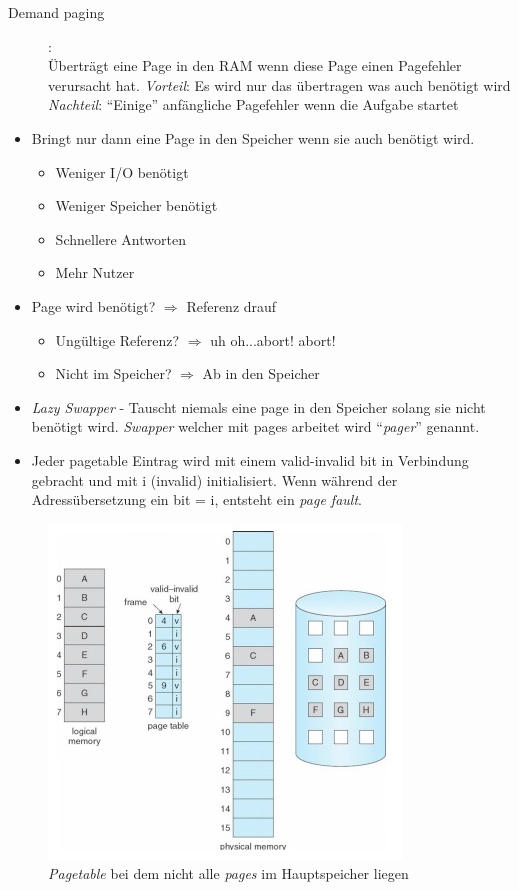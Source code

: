 \documentclass[a4paper]{scrreprt}
\begin{document}
\begin{description}
\item[Demand paging]:\ \\ Überträgt eine Page in den RAM wenn diese Page einen Pagefehler verursacht hat.
\subitem \textit{Vorteil}: Es wird nur das übertragen was auch benötigt wird 
\subitem \textit{Nachteil}: "`Einige"' anfängliche Pagefehler wenn die Aufgabe startet
\end{description}
\begin{itemize}
\item Bringt nur dann eine Page in den Speicher wenn sie auch benötigt wird.
\begin{itemize}
\item Weniger I/O benötigt
\item Weniger Speicher benötigt
\item Schnellere Antworten
\item Mehr Nutzer
\end{itemize}
\item Page wird benötigt? $\Rightarrow$ Referenz drauf

\begin{itemize}
\item Ungültige Referenz? $\Rightarrow$ uh oh...abort! abort!
\item Nicht im Speicher? $\Rightarrow$ Ab in den Speicher
\end{itemize}
\item \textit{Lazy Swapper} - Tauscht niemals eine page in den Speicher solang sie nicht benötigt wird.
\subitem \textit{Swapper} welcher mit pages arbeitet wird "`\textit{pager}"' genannt.

\item Jeder pagetable Eintrag wird mit einem valid-invalid bit in Verbindung gebracht und mit i (invalid) initialisiert. Wenn während der Adressübersetzung ein bit = i, entsteht ein \textit{page fault}.
\end{itemize}

\begin{figure}[ht]
\centering
\includegraphics[scale=0.5]{graphics/pagesnotinmemory.png}
\caption{\textit{Pagetable} bei dem nicht alle \textit{pages} im Hauptspeicher liegen}
\end{figure}
\end{document}
